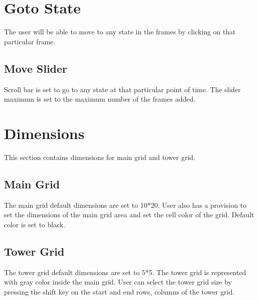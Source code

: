 \documentclass[12pt,a4paper]{article}
\begin{document}
\section{Goto State}
The user will be able to move to any state in the frames by clicking on that particular frame.
\subsection{Move Slider}
Scroll bar is set to go to any state at that particular point of time. The slider maximum is set to the maximum number of the frames added.
\section{Dimensions}
This section contains dimensions for main grid and tower grid.
\subsection{Main Grid}
The main grid default dimensions are set to 10*20. User also has a provision to set the dimensions of the main grid area and set the cell color of the grid. Default color is set to black.
\subsection{Tower Grid}
The tower grid default dimensions are set to 5*5. The tower grid is represented with gray color inside the main grid. User can select the tower grid size by pressing the shift key on the start and end rows, columns of the tower grid.
\end{document}
